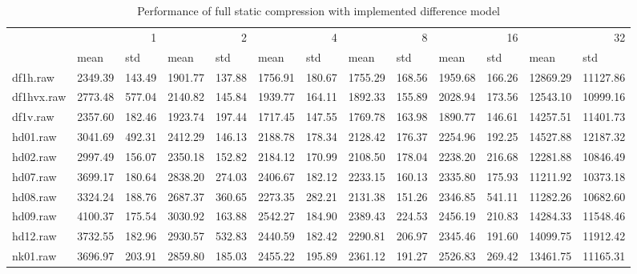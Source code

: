 \begin{table}
\caption{Performance of full static compression with implemented difference model}
\begin{tabular}{lllllllllllll}
 & \multicolumn{2}{r}{1} & \multicolumn{2}{r}{2} & \multicolumn{2}{r}{4} & \multicolumn{2}{r}{8} & \multicolumn{2}{r}{16} & \multicolumn{2}{r}{32} \\
 & mean & std & mean & std & mean & std & mean & std & mean & std & mean & std \\
df1h.raw & 2349.39 & 143.49 & 1901.77 & 137.88 & 1756.91 & 180.67 & 1755.29 & 168.56 & 1959.68 & 166.26 & 12869.29 & 11127.86 \\
df1hvx.raw & 2773.48 & 577.04 & 2140.82 & 145.84 & 1939.77 & 164.11 & 1892.33 & 155.89 & 2028.94 & 173.56 & 12543.10 & 10999.16 \\
df1v.raw & 2357.60 & 182.46 & 1923.74 & 197.44 & 1717.45 & 147.55 & 1769.78 & 163.98 & 1890.77 & 146.61 & 14257.51 & 11401.73 \\
hd01.raw & 3041.69 & 492.31 & 2412.29 & 146.13 & 2188.78 & 178.34 & 2128.42 & 176.37 & 2254.96 & 192.25 & 14527.88 & 12187.32 \\
hd02.raw & 2997.49 & 156.07 & 2350.18 & 152.82 & 2184.12 & 170.99 & 2108.50 & 178.04 & 2238.20 & 216.68 & 12281.88 & 10846.49 \\
hd07.raw & 3699.17 & 180.64 & 2838.20 & 274.03 & 2406.67 & 182.12 & 2233.15 & 160.13 & 2335.80 & 175.93 & 11211.92 & 10373.18 \\
hd08.raw & 3324.24 & 188.76 & 2687.37 & 360.65 & 2273.35 & 282.21 & 2131.38 & 151.26 & 2346.85 & 541.11 & 11282.26 & 10682.60 \\
hd09.raw & 4100.37 & 175.54 & 3030.92 & 163.88 & 2542.27 & 184.90 & 2389.43 & 224.53 & 2456.19 & 210.83 & 14284.33 & 11548.46 \\
hd12.raw & 3732.55 & 182.96 & 2930.57 & 532.83 & 2440.59 & 182.42 & 2290.81 & 206.97 & 2345.46 & 191.60 & 14099.75 & 11912.42 \\
nk01.raw & 3696.97 & 203.91 & 2859.80 & 185.03 & 2455.22 & 195.89 & 2361.12 & 191.27 & 2526.83 & 269.42 & 13461.75 & 11165.31 \\
\end{tabular}
\end{table}
